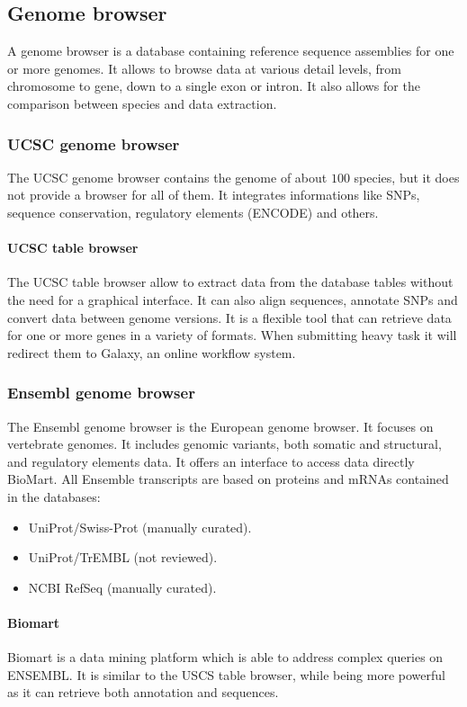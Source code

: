 	\subsection{Genome browser}
	A genome browser is a database containing reference sequence assemblies for one or more genomes.
	It allows to browse data at various detail levels, from chromosome to gene, down to a single exon or intron.
	It also allows for the comparison between species and data extraction.

		\subsubsection{UCSC genome browser}
		The UCSC genome browser contains the genome of about $100$ species, but it does not provide a browser for all of them.
		It integrates informations like SNPs, sequence conservation, regulatory elements (ENCODE) and others.

			\paragraph{UCSC table browser}
			The UCSC table browser allow to extract data from the database tables without the need for a graphical interface.
			It can also align sequences, annotate SNPs and convert data between genome versions.
			It is a flexible tool that can retrieve data for one or more genes in a variety of formats.
			When submitting heavy task it will redirect them to Galaxy, an online workflow system.

		\subsubsection{Ensembl genome browser}
		The Ensembl genome browser is the European genome browser.
		It focuses on vertebrate genomes.
		It includes genomic variants, both somatic and structural, and regulatory elements data.
		It offers an interface to access data directly BioMart.
		All Ensemble transcripts are based on proteins and mRNAs contained in the databases:

		\begin{multicols}{3}
			\begin{itemize}
				\item UniProt/Swiss-Prot (manually curated).
				\item UniProt/TrEMBL (not reviewed).
				\item NCBI RefSeq (manually curated).
			\end{itemize}
		\end{multicols}

			\paragraph{Biomart}
			Biomart is a data mining platform which is able to address complex queries on ENSEMBL.
			It is similar to the USCS table browser, while being more powerful as it can retrieve both annotation and sequences.
